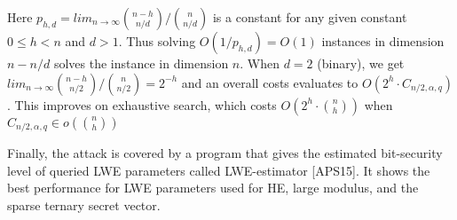 Here $p_{h,d} = lim_{n \rightarrow \infty} \binom{n-h}{n/d}/\binom{n}{n/d}$ is a constant for any given constant $0 \leq h < n$ and $d > 1$. Thus solving $O(1/p_{h,d})=O(1)$ instances in dimension $n-n/d$ solves the instance in dimension $n$. When $d=2$ (binary), we get $lim_{n \rightarrow \infty} \binom{n-h}{n/2}/\binom{n}{n/2}=2^{-h}$ and an overall costs evaluates to $O(2^h\cdot C_{n/2,\alpha,q})$. This improves on exhaustive search, which costs $O(2^h\cdot \binom{n}{h})$ when $C_{n/2,\alpha,q} \in o(\binom{n}{h})$

Finally, the attack is covered by a program that gives the estimated bit-security level of queried LWE parameters called LWE-estimator [APS15]. It shows the best performance for LWE parameters used for HE, large modulus, and the sparse ternary secret vector.




